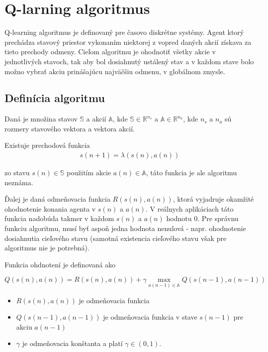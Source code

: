 \chapter{Q-larning algoritmus}

Q-learning algoritmus je definovaný pre časovo diskrétne systémy.
Agent ktorý prechádza stavový priestor vykonaním niektorej z vopred daných
akcií získava za tieto prechody odmeny. Cieľom algoritmu je ohodnotiť všetky akcie
v jednotlivých stavoch, tak aby bol dosiahnutý ustálený stav a v každom stave
bolo možno vybrať akciu prinášajúcu najväčšiu odmenu, v globálnom zmysle.


\section{Definícia algoritmu}

Daná je množina stavov $\mathbb{S}$ a akcií $\mathbb{A}$, kde
 $\mathbb{S} \in \mathbb{R}^{n_s}$ a $\mathbb{A} \in \mathbb{R}^{n_a}$, kde
$n_s$ a  $n_a$ sú rozmery stavového vektora a vektora akcií.

Existuje prechodová funkcia
\begin{align}
        s(n+1) = \lambda(s(n), a(n))
\end{align}

zo stavu $s(n) \in \mathbb{S}$ použitím akcie $a(n) \in \mathbb{A}$, táto funkcia je ale algoritmu neznáma.

Ďalej je daná odmeňovacia funkcia $R(s(n),a(n))$, ktorá vyjadruje okamžité ohodnotenie konania
agenta v $s(n)$ a $a(n)$. V reálnych aplikáciach táto funkcia nadobúda takmer v každom
$s(n)$ a $a(n)$ hodnotu $0$. Pre správnu funkciu algoritmu, musí byť aspoň jedna hodnota
nenulová - napr. ohodnotenie dosiahnutia cieľového stavu (samotná existencia cieľového
stavu však pre algoritmus nie je potrebná).

Funkcia ohdnotení je definovaná ako

\begin{equation}
Q(s(n),a(n)) = R(s(n),a(n)) + \gamma \max_{a(n-1) \in \mathbb{A}} Q(s(n-1), a(n-1))
\label{eq:q_learning}
\end{equation}

\begin{itemize}
 \item $R(s(n),a(n))$ je odmeňovacia funkcia
 \item $Q(s(n-1),a(n-1))$ je odmeňovacia funkcia v stave $s(n-1)$ pre akciu $a(n-1)$
 \item $\gamma$ je odmeňovacia konštanta a platí $\gamma \in (0, 1)$.
\end{itemize}

